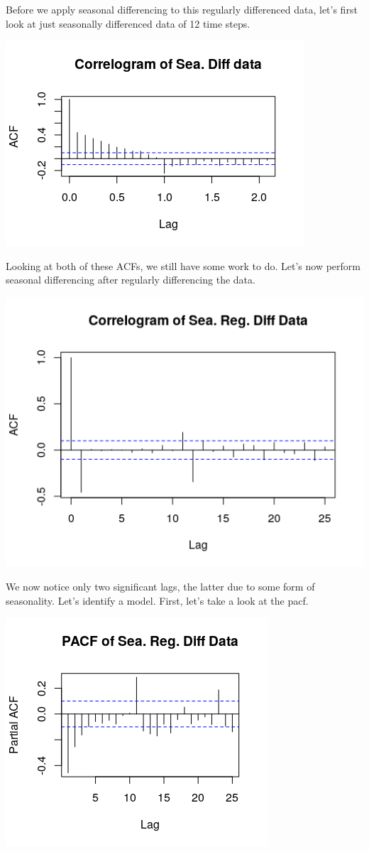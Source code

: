 \documentclass[11pt]{article}
\begin{document}
Before we apply seasonal differencing to this regularly differenced data, let's first look at just seasonally differenced data of 12 time steps.
\begin{center}
\includegraphics[scale=1]{4B2}
\end{center}
Looking at both of these ACFs, we still have some work to do. Let's now perform seasonal differencing after regularly differencing the data.
\begin{center}
\includegraphics[scale=1]{4C}
\end{center}
We now notice only two significant lags, the latter due to some form of seasonality. Let's identify a model. First, let's take a look at the pacf.
\begin{center}
\includegraphics[scale=1]{4D}
\end{center}
\end{document}
